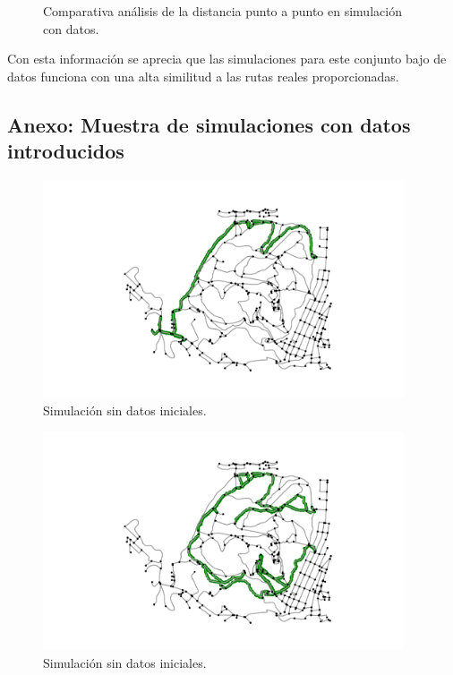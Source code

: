 \begin{figure}[!htb]
\begin{minipage}{0.48\textwidth}
\caption{Comparativa análisis de la distancia punto a punto en simulación con datos.}
\label{figure:ComparativaEmpty}
\end{minipage}
\end{figure}
\newpage

Con esta información se aprecia que las simulaciones para este conjunto bajo de datos funciona con una alta similitud a las rutas reales proporcionadas.

\newpage
\newpage
\subsection{Anexo: Muestra de simulaciones con datos introducidos} \label{subseciton:SimulationSample}\begin{figure}[h]
\begin{center}
\includegraphics[width=0.95\textwidth]{./Imagenes/data-simulation/track1.png}
\caption{Simulación sin datos iniciales.}
\end{center}
\label{figure:Simulation1}
\end{figure}

\begin{figure}[h]
\begin{center}
\includegraphics[width=0.95\textwidth]{./Imagenes/data-simulation/track2.png}
\caption{Simulación sin datos iniciales.}
\end{center}
\label{figure:Simulation2}
\end{figure}

